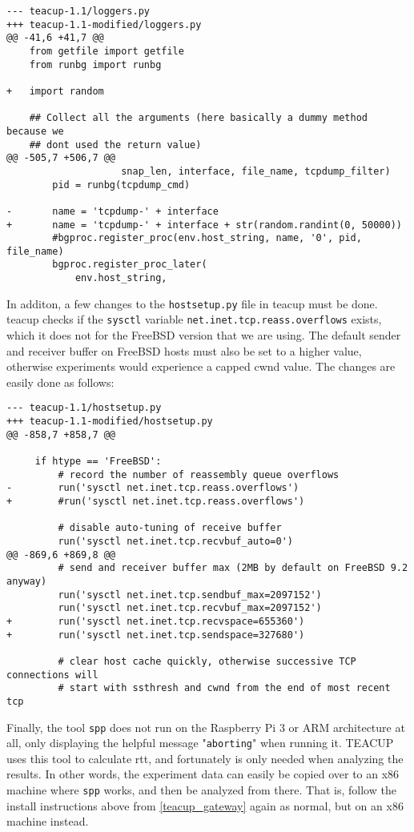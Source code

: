 \begin{verbatim}
--- teacup-1.1/loggers.py
+++ teacup-1.1-modified/loggers.py
@@ -41,6 +41,7 @@
    from getfile import getfile
    from runbg import runbg
    
+   import random
    
    ## Collect all the arguments (here basically a dummy method because we
    ## dont used the return value)
@@ -505,7 +506,7 @@
                    snap_len, interface, file_name, tcpdump_filter)
        pid = runbg(tcpdump_cmd)
    
-       name = 'tcpdump-' + interface
+       name = 'tcpdump-' + interface + str(random.randint(0, 50000))
        #bgproc.register_proc(env.host_string, name, '0', pid, file_name)
        bgproc.register_proc_later(
            env.host_string,
\end{verbatim}

In additon, a few changes to the \lstinline{hostsetup.py} file in \gls{teacup} must be done. \gls{teacup} checks if the \lstinline{sysctl} variable \lstinline{net.inet.tcp.reass.overflows} exists, which it does not for the FreeBSD version that we are using. The default sender and receiver buffer on FreeBSD hosts must also be set to a higher value, otherwise experiments would experience a capped \gls{cwnd} value. The changes are easily done as follows:

\begin{verbatim}
--- teacup-1.1/hostsetup.py
+++ teacup-1.1-modified/hostsetup.py
@@ -858,7 +858,7 @@
 
     if htype == 'FreeBSD':
         # record the number of reassembly queue overflows
-        run('sysctl net.inet.tcp.reass.overflows')
+        #run('sysctl net.inet.tcp.reass.overflows')
 
         # disable auto-tuning of receive buffer
         run('sysctl net.inet.tcp.recvbuf_auto=0')
@@ -869,6 +869,8 @@
         # send and receiver buffer max (2MB by default on FreeBSD 9.2 anyway)
         run('sysctl net.inet.tcp.sendbuf_max=2097152')
         run('sysctl net.inet.tcp.recvbuf_max=2097152')
+        run('sysctl net.inet.tcp.recvspace=655360')
+        run('sysctl net.inet.tcp.sendspace=327680')
 
         # clear host cache quickly, otherwise successive TCP connections will
         # start with ssthresh and cwnd from the end of most recent tcp
\end{verbatim}

Finally, the tool \lstinline{spp} does not run on the Raspberry Pi 3 or ARM architecture at all, only displaying the helpful message "\lstinline{aborting}" when running it. TEACUP uses this tool to calculate \gls{rtt}, and fortunately is only needed when analyzing the results. In other words, the experiment data can easily be copied over to an x86 machine where \lstinline{spp} works, and then be analyzed from there. That is, follow the install instructions above from \ref{teacup_gateway} again as normal, but on an x86 machine instead.

